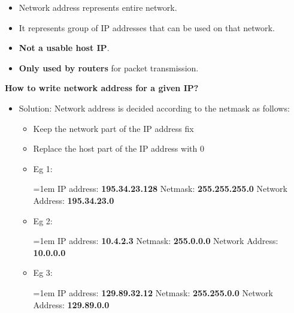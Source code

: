 \setlength{\columnsep}{3pt}
\begin{flushleft}
\bigskip
\begin{itemize}
	\item Network address represents entire network.
	\item  It represents group of IP addresses that can be used on that network.
	\item \textbf{Not a usable host IP}.
	\item \textbf{Only used by routers} for packet transmission.
\end{itemize}


\textbf{How to write network address for a given IP?}
\begin{itemize}
	\item Solution: Network address is decided according to the netmask as follows:
	\begin{itemize}
		\item Keep the network part of the IP address fix
		\item Replace the host part of the IP address with 0
		\item Eg 1:
		\bigskip
		\begin{tcolorbox}[breakable,notitle,boxrule=-0pt,colback=pink,colframe=pink]
			\color{black}
			\font=1em
			IP address: \textbf{195.34.23.128}
			\newline
			Netmask: \textbf{255.255.255.0}
			\newline
			Network Address: \textbf{195.34.23.0}
			\font=4pt
		\end{tcolorbox}
		\item Eg 2:
		\bigskip
		\begin{tcolorbox}[breakable,notitle,boxrule=-0pt,colback=pink,colframe=pink]
			\color{black}
			\font=1em
			IP address: \textbf{10.4.2.3}
			\newline
			Netmask: \textbf{255.0.0.0}
			\newline
			Network Address: \textbf{10.0.0.0}
			\font=4pt
		\end{tcolorbox}
	\item Eg 3:
	\bigskip
	\begin{tcolorbox}[breakable,notitle,boxrule=-0pt,colback=pink,colframe=pink]
		\color{black}
		\font=1em
		IP address: \textbf{129.89.32.12}
		\newline
		Netmask: \textbf{255.255.0.0}
		\newline
		Network Address: \textbf{129.89.0.0}
		\font=4pt
	\end{tcolorbox}
	\end{itemize}


\end{itemize}

\end{flushleft}
\newpage
